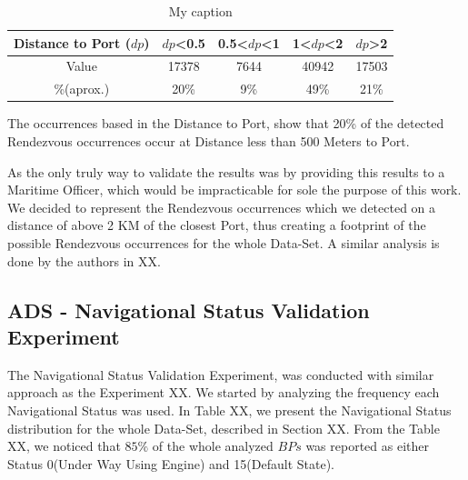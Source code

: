 \begin{table}[H]
\centering
\caption{My caption}
\label{my-label}
\begin{tabular}{@{}ccccc@{}}
\toprule
Distance to Port ($dp$) & $dp$\textless{}0.5 & 0.5\textless{}$dp$\textless{}1 & 1\textless{}$dp$\textless{}2 & $dp$\textgreater{}2 \\ \midrule
Value                 & 17378              & 7644                             & 40942                          & 17503               \\
\%(aprox.)                    & 20\%               & 9\%                              & 49\%                           & 21\%                \\ \bottomrule
\end{tabular}%
\end{table}

The occurrences based in the Distance to Port, show that 20\% of the detected Rendezvous occurrences occur at Distance less than 500 Meters to Port. 

As the only truly way to validate the results was by providing this results to a Maritime Officer, which would be impracticable for sole the purpose of this work. We decided to represent the Rendezvous occurrences which we detected on a distance of above 2 KM of the closest Port, thus creating a footprint of the possible Rendezvous occurrences for the whole Data-Set. A similar analysis is done by the authors in XX. 


\subsection{ADS - Navigational Status Validation Experiment}
The Navigational Status Validation Experiment, was conducted with similar approach as the Experiment XX. 
We started by analyzing the frequency each Navigational Status was used. In Table XX, we present the   
Navigational Status distribution for the whole Data-Set, described in Section XX.
From the Table XX, we noticed that $85\%$ of the whole analyzed $BPs$ was reported as either Status 0(Under Way Using Engine) and 15(Default State).

